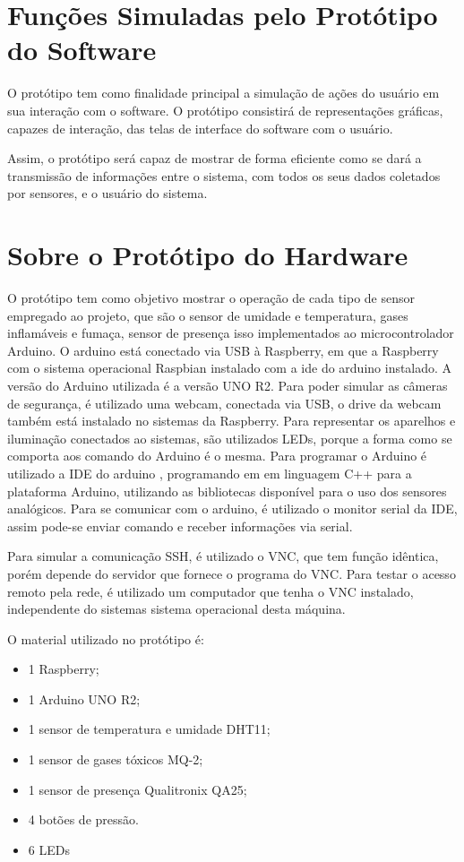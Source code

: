 \section{Funções Simuladas pelo Protótipo do Software}
\par O protótipo tem como finalidade principal a simulação de ações do usuário em sua interação com o software. O protótipo consistirá de representações gráficas, capazes de interação, das telas de interface do software com o usuário.
\par Assim, o protótipo será capaz de mostrar de forma eficiente como se dará a transmissão de informações entre o sistema, com todos os seus dados coletados por sensores, e o usuário do sistema.

\section{Sobre o Protótipo do Hardware}
\par O protótipo tem como objetivo mostrar o operação de cada tipo de sensor empregado ao projeto, que são  o sensor de umidade e temperatura, gases inflamáveis e fumaça, sensor de presença isso implementados ao microcontrolador Arduino. O arduino está conectado via USB à Raspberry, em que a Raspberry com o sistema operacional Raspbian instalado com a ide do arduino instalado. A versão do Arduino utilizada é a versão UNO R2. Para poder simular as câmeras de segurança, é utilizado uma webcam, conectada via USB, o drive da webcam também está instalado no sistemas da Raspberry. Para representar os aparelhos e iluminação conectados ao sistemas, são utilizados LEDs, porque a forma como se comporta aos comando do Arduino é o mesma. Para programar o Arduino é utilizado a IDE do arduino , programando em em  linguagem C++ para a plataforma Arduino, utilizando as bibliotecas disponível para o uso dos sensores analógicos.  Para se comunicar com o arduino, é utilizado o monitor serial da IDE, assim pode-se enviar comando e receber informações via serial.
\par Para simular a comunicação SSH, é utilizado o VNC, que tem função idêntica, porém depende do servidor que fornece o programa do VNC. Para testar o acesso remoto pela rede, é utilizado um computador que tenha o VNC instalado, independente do sistemas sistema operacional desta máquina.
\par O material utilizado no protótipo é:
\begin{itemize}
    \item 1 Raspberry;
    \item 1 Arduino UNO R2;
    \item 1 sensor de temperatura e umidade DHT11;
    \item 1 sensor de gases tóxicos MQ-2;
    \item 1 sensor de presença Qualitronix QA25;
    \item 4 botões de pressão.
    \item 6 LEDs
\end{itemize}
